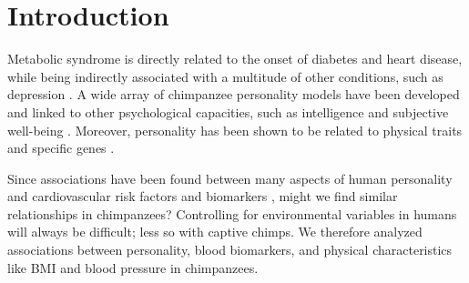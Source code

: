 \documentclass[a0,landscape]{a0poster}
\begin{document}
%
%
%


\color{Black} %

\section*{Introduction}

Metabolic syndrome is directly related to the onset of diabetes and heart disease, while being indirectly associated with a multitude of other conditions, such as depression \cite{shively2002depression}. A wide array of chimpanzee personality models have been developed and linked to other psychological capacities, such as intelligence and subjective well-being \cite{weiss2002subjective}. Moreover, personality has been shown to be related to physical traits  \cite{wilson2014personality} and specific genes \cite{latzman2014personality}.

Since associations have been found between many aspects of human personality and cardiovascular risk factors and biomarkers \cite{sutin2010cholesterol}, might we find similar relationships in chimpanzees? Controlling for environmental variables in humans will always be difficult; less so with captive chimps. We therefore analyzed associations between personality, blood biomarkers, and physical characteristics like BMI and blood pressure in chimpanzees.
\end{document}
